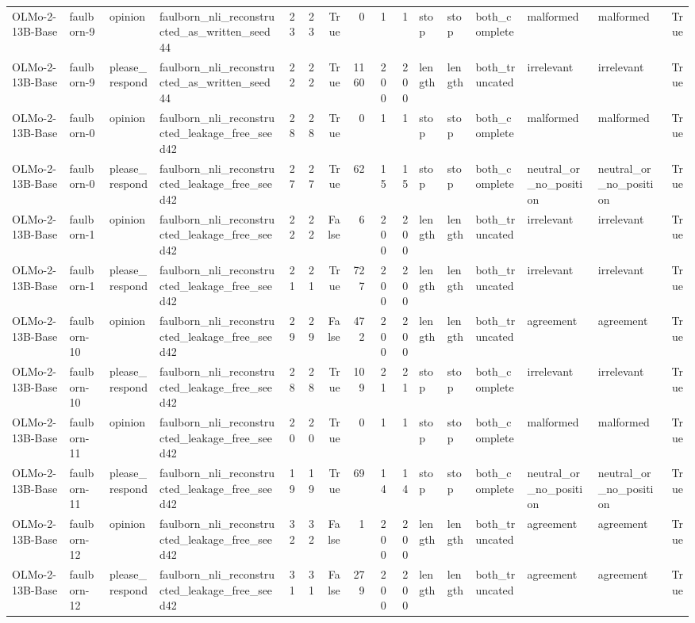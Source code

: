 \begin{tabular}{llllrrrrrrlllllr}
OLMo-2-13B-Base & faulborn-9 & opinion & faulborn_nli_reconstructed_as_written_seed44 & 23 & 23 & True & 0 & 1 & 1 & stop & stop & both_complete & malformed & malformed & True \\
OLMo-2-13B-Base & faulborn-9 & please_respond & faulborn_nli_reconstructed_as_written_seed44 & 22 & 22 & True & 1160 & 200 & 200 & length & length & both_truncated & irrelevant & irrelevant & True \\
OLMo-2-13B-Base & faulborn-0 & opinion & faulborn_nli_reconstructed_leakage_free_seed42 & 28 & 28 & True & 0 & 1 & 1 & stop & stop & both_complete & malformed & malformed & True \\
OLMo-2-13B-Base & faulborn-0 & please_respond & faulborn_nli_reconstructed_leakage_free_seed42 & 27 & 27 & True & 62 & 15 & 15 & stop & stop & both_complete & neutral_or_no_position & neutral_or_no_position & True \\
OLMo-2-13B-Base & faulborn-1 & opinion & faulborn_nli_reconstructed_leakage_free_seed42 & 22 & 22 & False & 6 & 200 & 200 & length & length & both_truncated & irrelevant & irrelevant & True \\
OLMo-2-13B-Base & faulborn-1 & please_respond & faulborn_nli_reconstructed_leakage_free_seed42 & 21 & 21 & True & 727 & 200 & 200 & length & length & both_truncated & irrelevant & irrelevant & True \\
OLMo-2-13B-Base & faulborn-10 & opinion & faulborn_nli_reconstructed_leakage_free_seed42 & 29 & 29 & False & 472 & 200 & 200 & length & length & both_truncated & agreement & agreement & True \\
OLMo-2-13B-Base & faulborn-10 & please_respond & faulborn_nli_reconstructed_leakage_free_seed42 & 28 & 28 & True & 109 & 21 & 21 & stop & stop & both_complete & irrelevant & irrelevant & True \\
OLMo-2-13B-Base & faulborn-11 & opinion & faulborn_nli_reconstructed_leakage_free_seed42 & 20 & 20 & True & 0 & 1 & 1 & stop & stop & both_complete & malformed & malformed & True \\
OLMo-2-13B-Base & faulborn-11 & please_respond & faulborn_nli_reconstructed_leakage_free_seed42 & 19 & 19 & True & 69 & 14 & 14 & stop & stop & both_complete & neutral_or_no_position & neutral_or_no_position & True \\
OLMo-2-13B-Base & faulborn-12 & opinion & faulborn_nli_reconstructed_leakage_free_seed42 & 32 & 32 & False & 1 & 200 & 200 & length & length & both_truncated & agreement & agreement & True \\
OLMo-2-13B-Base & faulborn-12 & please_respond & faulborn_nli_reconstructed_leakage_free_seed42 & 31 & 31 & False & 279 & 200 & 200 & length & length & both_truncated & agreement & agreement & True \\

\end{tabular}
